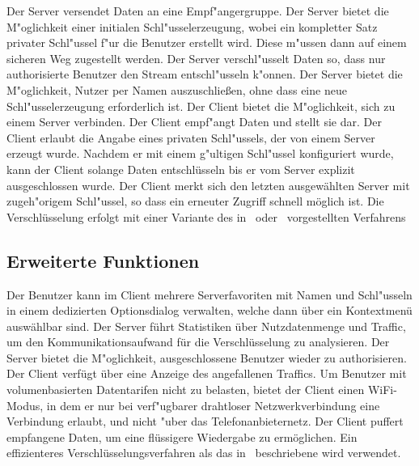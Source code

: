 \documentclass[a4paper,10pt]{scrartcl}
\begin{document}
\begin{usecase}
 {Der Server versendet Daten an eine Empf"angergruppe.}
 {Der Server bietet die M"oglichkeit einer initialen Schl"usselerzeugung, wobei
                 ein kompletter Satz privater Schl"ussel f"ur die Benutzer erstellt wird.
                 Diese m"ussen dann auf einem sicheren Weg zugestellt werden.}
 {Der Server verschl"usselt Daten so, dass nur authorisierte
                 Benutzer den Stream entschl"usseln k"onnen.}
 {Der Server bietet die M"oglichkeit, Nutzer per Namen auszuschließen,
                 ohne dass eine neue Schl"usselerzeugung erforderlich ist.}
 {Der Client bietet die M"oglichkeit, sich zu einem Server verbinden.}
 {Der Client empf"angt Daten und stellt sie dar.}
 {Der Client erlaubt die Angabe eines privaten Schl"ussels, der von
                 einem Server erzeugt wurde.}
 {Nachdem er mit einem g"ultigen Schl"ussel konfiguriert wurde, kann der
                 Client solange Daten entschlüsseln bis er vom Server explizit ausgeschlossen wurde.}
 {Der Client merkt sich den letzten ausgewählten Server mit
                 zugeh"origem Schl"ussel, so dass ein erneuter Zugriff schnell möglich
                 ist.}
 {Die Verschlüsselung erfolgt mit einer Variante des in~\cite[Section 2.2]{Naor00}
                  oder~\cite{Garg10} vorgestellten Verfahrens}
\end{usecase}

\subsection{Erweiterte Funktionen}

\begin{usecase}
 {Der Benutzer kann im Client mehrere Serverfavoriten
                  mit Namen und Schl"usseln in einem dedizierten Optionsdialog verwalten,
                  welche dann über ein Kontextmenü auswählbar sind.}
 {Der Server führt Statistiken über Nutzdatenmenge und Traffic,
                  um den Kommunikationsaufwand für die Verschlüsselung zu
                  analysieren.}
 {Der Server bietet die M"oglichkeit, ausgeschlossene Benutzer wieder
                  zu authorisieren.}
 {Der Client verfügt über eine Anzeige des angefallenen Traffics.}
 {Um Benutzer mit volumenbasierten Datentarifen nicht zu belasten,
                  bietet der Client einen WiFi-Modus, in dem er nur bei
                  verf"ugbarer drahtloser Netzwerkverbindung eine Verbindung erlaubt,
                  und nicht "uber das Telefonanbieternetz.}
 {Der Client puffert empfangene Daten, um eine flüssigere
                  Wiedergabe zu ermöglichen.}
 {Ein effizienteres Verschlüsselungsverfahren als das in~\cite{Naor00} beschriebene
                  wird verwendet.}
\end{usecase}
\end{document}
